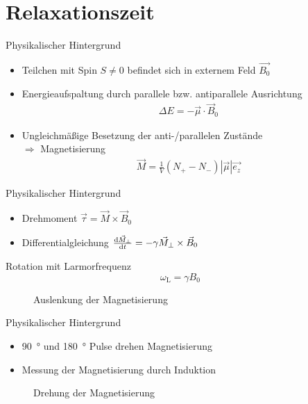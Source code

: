
\thispagestyle{empty}
\frame{\titlepage}


\section{Relaxationszeit}
\begin{frame}{Physikalischer Hintergrund}
	\begin{itemize}
	\item Teilchen mit Spin $S\neq 0$ befindet sich in externem Feld $\vec{B_{0}}$
	\item Energieaufspaltung durch parallele bzw. antiparallele Ausrichtung
		\begin{align*}
		\Delta E = -\vec{\mu}\cdot\vec{B}_0
		\end{align*}
	\item Ungleichmäßige Besetzung der anti-/parallelen Zustände\\
	 $\Rightarrow$ Magnetisierung 
		\begin{align*}
		\vec{M}=\frac{1}{V}(N_{+}-N_{-})|\vec{\mu}|\vec{e_{z}}
		\end{align*}
	\end{itemize}
\end{frame}

\begin{frame}{Physikalischer Hintergrund}
	\begin{itemize}
	\item Drehmoment $\vec{\tau}=\vec{M}\times\vec{B}_0$
	\item Differentialgleichung $\dv{\vec{M}_\bot}{t}=-\gamma\vec{M}_\bot\times\vec{B}_0$
	\end{itemize}
	\begin{block}{Rotation mit Larmorfrequenz}
		\[
		\omega_\text{L}=\gamma B_0
		\]
	\end{block}
	\begin{figure}
	
	\caption{Auslenkung der Magnetisierung}
	\end{figure}
\end{frame}

\begin{frame}{Physikalischer Hintergrund}
	\begin{itemize}
	\item \SI{90}{\degree} und \SI{180}{\degree} Pulse drehen Magnetisierung
	\item Messung der Magnetisierung durch Induktion
	\end{itemize}
	\begin{figure}
	\centering
	
	\caption{Drehung der Magnetisierung}
	\end{figure}
\end{frame}

